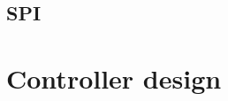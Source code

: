 \documentclass[../../main]{subfiles}
\begin{document}
\subsection{SPI}%
\label{sub:spi}



\section{Controller design}%
\label{sec:controller_design}

\end{document}
